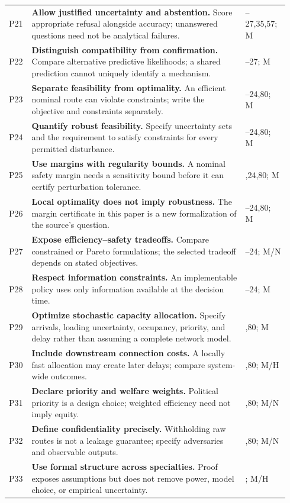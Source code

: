 \begin{longtable}{@{}>{\raggedright\arraybackslash}p{0.055\linewidth}>{\raggedright\arraybackslash}p{0.735\linewidth}>{\raggedright\arraybackslash}p{0.15\linewidth}@{}}
P21 & \textbf{Allow justified uncertainty and abstention.} Score appropriate refusal alongside accuracy; unanswered questions need not be analytical failures. & 26--27,35,57; M\\[0.5em]
P22 & \textbf{Distinguish compatibility from confirmation.} Compare alternative predictive likelihoods; a shared prediction cannot uniquely identify a mechanism. & 26--27; M\\[0.5em]
P23 & \textbf{Separate feasibility from optimality.} An efficient nominal route can violate constraints; write the objective and constraints separately. & 22--24,80; M\\[0.5em]
P24 & \textbf{Quantify robust feasibility.} Specify uncertainty sets and the requirement to satisfy constraints for every permitted disturbance. & 22--24,80; M\\[0.5em]
P25 & \textbf{Use margins with regularity bounds.} A nominal safety margin needs a sensitivity bound before it can certify perturbation tolerance. & 22,24,80; M\\[0.5em]
P26 & \textbf{Local optimality does not imply robustness.} The margin certificate in this paper is a new formalization of the source's question. & 23--24,80; M\\[0.5em]
P27 & \textbf{Expose efficiency--safety tradeoffs.} Compare constrained or Pareto formulations; the selected tradeoff depends on stated objectives. & 22--24; M/N\\[0.5em]
P28 & \textbf{Respect information constraints.} An implementable policy uses only information available at the decision time. & 23--24; M\\[0.5em]
P29 & \textbf{Optimize stochastic capacity allocation.} Specify arrivals, loading uncertainty, occupancy, priority, and delay rather than assuming a complete network model. & 24,80; M\\[0.5em]
P30 & \textbf{Include downstream connection costs.} A locally fast allocation may create later delays; compare system-wide outcomes. & 24,80; M/H\\[0.5em]
P31 & \textbf{Declare priority and welfare weights.} Political priority is a design choice; weighted efficiency need not imply equity. & 24,80; M/N\\[0.5em]
P32 & \textbf{Define confidentiality precisely.} Withholding raw routes is not a leakage guarantee; specify adversaries and observable outputs. & 24,80; M/N\\[0.5em]
P33 & \textbf{Use formal structure across specialties.} Proof exposes assumptions but does not remove power, model choice, or empirical uncertainty. & 23; M/H\\[0.5em]

\end{longtable}
